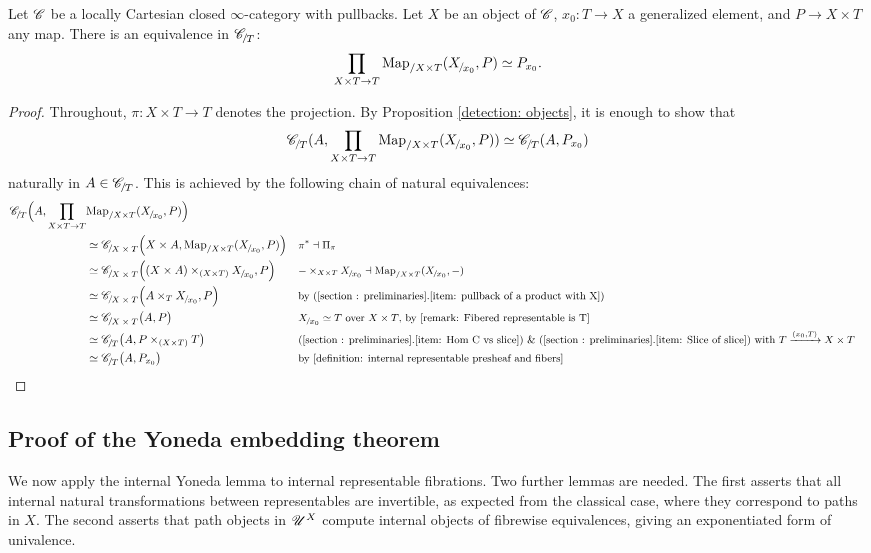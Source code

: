 \documentclass[twoside,a4paper,11pt]{amsart}
\begin{document}
\begin{lemma}\label{Yoneda Lemma}
Let $\mathscr{C}$ be a locally Cartesian closed $\infty$-category with pullbacks. Let $X$ be an object of $\mathscr{C}$, $x_0\colon T\to X$ a generalized element, and $P\to X\times T$ any map. There is an equivalence in $\slice{\C}{T}$: 
\begin{equation*}
    \prod_{X\times T\to T}\Map_{/X\times T}(\slice{X}{x_0}, P)\simeq P_{x_0}.
\end{equation*}
\end{lemma}
\begin{proof}
    Throughout, $\pi\colon X\times T\to T$ denotes the projection. By Proposition \ref{detection: objects}, it is enough to show that 
    \begin{equation*}
        \slice{\C}{T}(A,\prod_{X\times T\to T}\Map_{/X\times T}(\slice{X}{x_0}, P) )\simeq \slice{\C}{T}(A,P_{x_0})
    \end{equation*}
    naturally in $A\in\slice{\C}{T}$. This is achieved by the following chain of natural equivalences:
    \begin{align*}
    \slice{\C}{T}\Big(A,\prod_{X\times T\to T}&\Map_{/X\times T}(\slice{X}{x_0}, P)\Big)\\
        &\simeq \slice{\C}{X\times T}\Big(X\times A,\Map_{/X\times T}(\slice{X}{x_0}, P)\Big)&&\proofstep{$\pi^\ast\dashv\Pi_{\pi}$}\\
        &\simeq \slice{\C}{X\times T}\Big((X\times A)\times_{(X\times T)}\slice{X}{x_0},P\Big)&&\proofstep{$-\times_{X\times T}\slice{X}{x_0}\dashv\Map_{/X\times T}(\slice{X}{x_0},-)$}\\
        &\simeq \slice{\C}{X\times T}\Big( A\times_{ T}\slice{X}{x_0},P\Big) &&\proofstep{by \prelref{item: pullback of a product with X}}\\
        &\simeq\slice{\C}{X\times T}\big( A,P\big) &&\proofstep{$\slice{X}{x_0}\simeq T$ over $X\times T$, by \cref{remark: Fibered representable is T}}\\
        &\simeq \slice{\C}{T}\big(A,P\times_{(X\times T)}T\big) &&\proofstep{\prelref{item: Hom C vs slice} \& \prelref{item: Slice of slice} with $T\xrightarrow{(x_0,T)} X\times T$}  \\
        &\simeq  \slice{\C}{T}\big(A,P_{x_0}\big) &&\proofstep{by \cref{definition: internal representable presheaf and fibers}}
    \end{align*}
\end{proof}

\subsection{Proof of the Yoneda embedding theorem}\label{subsection: proof of Yoneda}
We now apply the internal Yoneda lemma to internal representable fibrations. Two further lemmas are needed. The first asserts that all internal natural transformations between representables are invertible, as expected from the classical case, where they correspond to paths in $X$. The second asserts that path objects in $\mathscr{U}^X$ compute internal objects of fibrewise equivalences, giving an exponentiated form of univalence.
\end{document}
